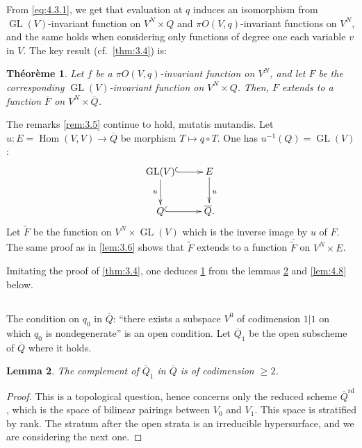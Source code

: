 \documentclass[11pt,a4paper]{article}
\theoremstyle{plain}
\newtheorem{theorem}{Th\'eor\`eme}
\newtheorem{lemma}[theorem]{Lemma}
\theoremstyle{definition}
\DeclareMathOperator{\Hom}{Hom}
\DeclareMathOperator{\GL}{GL}
\begin{document}
From \eqref{eq:4.3.1}, we get that evaluation at $q$ induces an isomorphism from $\GL(V)$-invariant function on $V^N \times Q$ and $\pi O(V,q)$-invariant functions on $V^N$, and the same holds when considering only functions of degree one each variable $v$ in $V$. The key result (cf.~\ref{thm:3.4}) is:

\begin{theorem}\label{thm:4.5}
Let $f$ be a $\pi O(V,q)$-invariant function on $V^N$, and let $F$ be the corresponding $\GL(V)$-invariant function on $V^N \times Q$. Then, $F$ extends to a function $\overline{F}$ on $V^N \times \overline{Q}$.
\end{theorem}

The remarks \ref{rem:3.5} continue to hold, mutatis mutandis. Let $u : E = \Hom(V,V) \to \overline{Q}$ be morphism $T \mapsto q \circ T$. One has $u^{-1}(Q) = \GL(V)$:
\begin{equation}\label{eq:4.5.1}
\xymatrix{
\GL(V) \ar@{^{(}->}[r] \ar[d]_{u} & E \ar[d]^{u} \\
Q \ar@{^{(}->}[r] & \overline{Q}.
}
\end{equation}
Let $\widetilde{F}$ be the function on $V^N \times \GL(V)$ which is the inverse image by $u$ of $F$. The same proof as in \ref{lem:3.6} shows that $\widetilde{F}$ extends to a function $\overline{\widetilde{F}}$ on $V^N \times E$.

Imitating the proof of \ref{thm:3.4}, one deduces \ref{thm:4.5} from the lemmas \ref{lem:4.7} and \ref{lem:4.8} below.

\subsection{}
The condition on $q_0$ in $\overline{Q}$: ``there exists a subspace $V^0$ of codimension $1|1$ on which $q_0$ is nondegenerate'' is an open condition. Let $\overline{Q}_1$ be the open subscheme of $\overline{Q}$ where it holds.

\begin{lemma}\label{lem:4.7}
The complement of $\overline{Q}_1$ in $\overline{Q}$ is of codimension $\geq 2$.
\end{lemma}

\begin{proof}
This is a topological question, hence concerns only the reduced scheme $\overline{Q}^{\mathrm{rd}}$, which is the space of bilinear pairings between $V_0$ and $V_1$. This space is stratified by rank. The stratum after the open strata is an irreducible hypersurface, and we are considering the next one.
\end{proof}
\end{document}

